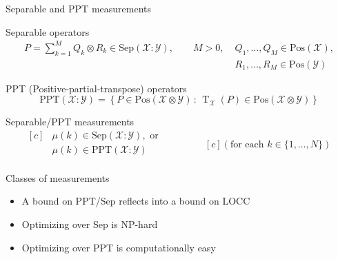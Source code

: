\documentclass{beamer}
\newcommand{\pt}{\operatorname{T}}
\def\X{\mathcal{X}}
\def\Y{\mathcal{Y}}
\newcommand{\setft}[1]{\mathrm{#1}}
\newcommand{\Pos}{\setft{Pos}}
\newcommand{\PPT}{\setft{PPT}}
\newcommand{\Sep}{\setft{Sep}}
\begin{document}
    \begin{frame}{Separable and PPT measurements}
        \begin{block}{Separable operators}
        \vspace{-15pt}
        \begin{align*}
            P = \sum_{k = 1}^{M} Q_k \otimes R_k \in \Sep(\X:\Y), \qquad M > 0,\;& Q_1,\ldots,Q_M \in \Pos(\X), \\[-10pt]  & R_1,\ldots,R_M\in\Pos(\Y)
        \end{align*}
        \end{block}
        \vspace{-10pt}
        \begin{block}{PPT (Positive-partial-transpose) operators}
        \vspace{-10pt}
        \[
            \PPT(\X:\Y) = \left\{ P \in \Pos(\X\otimes\Y) \,:\, \pt_{\X}(P) \in \Pos(\X\otimes\Y) \right\}  
        \]
        \end{block}
        \begin{block}{Separable/PPT measurements}
        \vspace{-10pt}
        \begin{equation*}
            \begin{aligned}[c]
            &\mu(k) \in \Sep(\X:\Y), \text{ or}\\
            &\mu(k) \in \PPT(\X:\Y)\\
            \end{aligned}
            \qquad\qquad
            \begin{aligned}[c]
            (\text{for each }k\in\{1,\ldots,N\})
            \end{aligned}
            \end{equation*} 
        \end{block}
    \end{frame}

    \begin{frame}{Classes of measurements}
        \begin{figure}[!ht]
            \centering
            \def\svgwidth{200pt}
            \scalebox{.60}{}
        \end{figure}
        \begin{itemize}
            \item A bound on PPT/Sep reflects into a bound on LOCC
            \item Optimizing over Sep is NP-hard
            \item Optimizing over PPT is computationally easy
        \end{itemize}
    \end{frame}  
\end{document}
